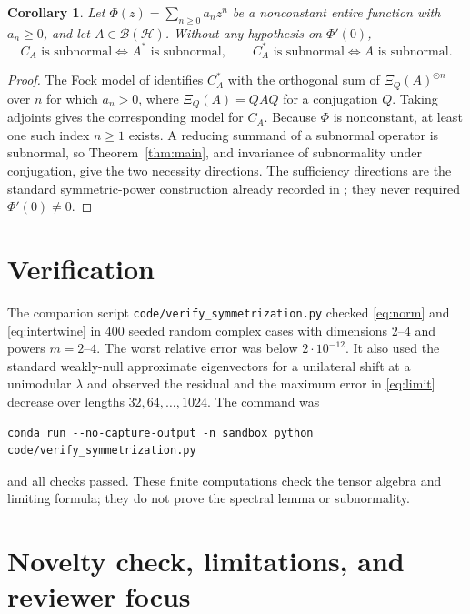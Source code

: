 \documentclass[11pt]{article}
\newtheorem{corollary}{Corollary}
\newcommand{\Hh}{\mathcal H}
\newcommand{\B}{\mathcal B}
\newcommand{\od}{\mathbin{\odot}}
\begin{document}
\begin{corollary}\label{cor:composition}
Let $\Phi(z)=\sum_{n\ge0}a_nz^n$ be a nonconstant entire function with
$a_n\ge0$, and let $A\in\B(\Hh)$.  Without any hypothesis on $\Phi'(0)$,
\[
 C_A\text{ is subnormal}\Longleftrightarrow A^*\text{ is subnormal},
 \qquad
 C_A^*\text{ is subnormal}\Longleftrightarrow A\text{ is subnormal}.
\]
\end{corollary}

\begin{proof}
The Fock model of \cite[Theorem~7.2]{SS} identifies $C_A^*$ with the
orthogonal sum of $\Xi_Q(A)^{\od n}$ over $n$ for which $a_n>0$, where
$\Xi_Q(A)=QAQ$ for a conjugation $Q$.  Taking adjoints gives the corresponding
model for $C_A$.  Because $\Phi$ is nonconstant, at least one such index
$n\ge1$ exists.  A reducing summand of a subnormal operator is subnormal, so
Theorem~\ref{thm:main}, and invariance of subnormality under conjugation,
give the two necessity directions.  The sufficiency directions are the
standard symmetric-power construction already recorded in
\cite[Proposition~10.5]{SS}; they never required $\Phi'(0)\ne0$.
\end{proof}

\section{Verification}

The companion script \texttt{code/verify\_symmetrization.py} checked
\eqref{eq:norm} and \eqref{eq:intertwine} in 400 seeded random complex cases
with dimensions $2$--$4$ and powers $m=2$--$4$.  The worst relative error was
below $2\cdot10^{-12}$.  It also used the standard weakly-null approximate
eigenvectors for a unilateral shift at a unimodular $\lambda$ and observed
the residual and the maximum error in \eqref{eq:limit} decrease over lengths
$32,64,\ldots,1024$.  The command was
\begin{verbatim}
conda run --no-capture-output -n sandbox python code/verify_symmetrization.py
\end{verbatim}
and all checks passed.  These finite computations check the tensor algebra
and limiting formula; they do not prove the spectral lemma or subnormality.

\section{Novelty check, limitations, and reviewer focus}
\end{document}
